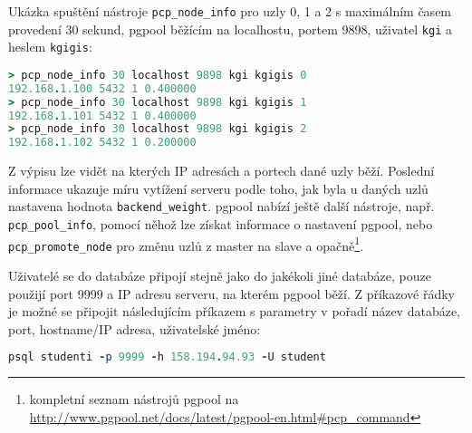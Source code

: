 Ukázka spuštění nástroje \texttt{pcp\_node\_info} pro uzly 0, 1 a 2 s maximálním
časem provedení 30 sekund, pgpool běžícím na localhostu, portem 9898, uživatel
\texttt{kgi} a heslem \texttt{kgigis}:
\begin{lstlisting}[language=ruby,morekeywords={pcp_node_info}]
> pcp_node_info 30 localhost 9898 kgi kgigis 0
192.168.1.100 5432 1 0.400000
> pcp_node_info 30 localhost 9898 kgi kgigis 1
192.168.1.101 5432 1 0.400000
> pcp_node_info 30 localhost 9898 kgi kgigis 2
192.168.1.102 5432 1 0.200000
\end{lstlisting}

Z výpisu lze vidět na kterých IP adresách a portech dané uzly běží. Poslední
informace ukazuje míru vytížení serveru podle toho, jak byla u daných uzlů
nastavena hodnota \texttt{backend\_weight}. pgpool nabízí ještě další nástroje,
např. \texttt{pcp\_pool\_info}, pomocí něhož lze získat informace o nastavení
pgpool, nebo \texttt{pcp\_promote\_node} pro změnu uzlů z master na slave a
opačně\footnote{kompletní seznam nástrojů pgpool na
\url{http://www.pgpool.net/docs/latest/pgpool-en.html\#pcp\_command}}.

Uživatelé se do databáze připojí stejně jako do jakékoli jiné databáze, pouze použijí port 9999 a IP adresu serveru, na kterém pgpool běží. Z příkazové řádky je možné se připojit následujícím příkazem s parametry v pořadí název databáze, port, hostname/IP adresa, uživatelské jméno:
\begin{lstlisting}[language=ruby,morekeywords={psql}]
psql studenti -p 9999 -h 158.194.94.93 -U student 
\end{lstlisting}
